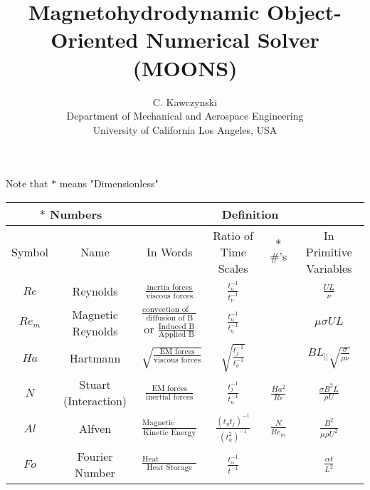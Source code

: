 \documentclass[landscape, 12pt]{report}
\begin{document}
\doublespacing
\title{Magnetohydrodynamic Object-Oriented Numerical Solver (MOONS)}
\author{C. Kawczynski \\
Department of Mechanical and Aerospace Engineering \\
University of California Los Angeles, USA\\}
\maketitle

Note that $*$ means "Dimensionless"

\resizebox{19cm}{!} {
	\begin{tabular}{|c|c|c|c|c|c|}
		\hline

		\multicolumn{2}{|c|}{$*$ Numbers} & \multicolumn{4}{|c|}{Definition} \\
		\hline
		Symbol & 
		Name &	
		In Words & 
		Ratio of Time Scales & 
		$*$ \#'s & 
		In Primitive Variables \\

		\hline \hline \hline
		\hline \hline \hline

		$Re$ 
		& Reynolds 
		& $\frac{\text{inertia forces}}{\text{viscous forces}}$
		& $\frac{t_u^{-1}}{t_{\nu}^{-1}}$
		&
		& $\frac{U L}{\nu}$ \\
		\hline

		$Re_m$ 
		& Magnetic Reynolds 
		& $\frac{\text{convection of B}}{\text{diffusion of B}}$
		or $\frac{\text{Induced B}}{\text{Applied B}}$
		& $\frac{t_u^{-1}}{t_{\eta}^{-1}}$
		&
		& $\mu \sigma U L$ \\
		\hline

		$Ha$ 
		& Hartmann
		& $\sqrt{\frac{\text{EM forces}}{\text{viscous forces}}}$
		& $\sqrt{\frac{t_{j}^{-1}}{t_{\nu}^{-1}}}$
		&
		& $B L_{||} \sqrt{\frac{\sigma}{\rho \nu}}$ \\
		\hline

		$N$ 
		& Stuart (Interaction)
		& $\frac{\text{EM forces}}{\text{inertial forces}}$
		& $\frac{t_j^{-1}}{t_{u}^{-1}}$
		& $\frac{Ha^2}{Re}$
		& $\frac{\sigma B^2 L}{\rho U}$ \\
		\hline

		$Al$ 
		& Alfven
		& $\frac{\text{Magnetic Energy}}{\text{Kinetic Energy}}$
		& $\frac{(t_{\eta} t_j)^{-1}}{(t_{u}^2)^{-1}}$
		& $\frac{N}{Re_m}$
		& $\frac{B^2}{\mu \rho U^2}$ \\
		\hline

		$Fo$ 
		& Fourier Number
		& $\frac{\text{Heat Conduction}}{\text{Heat Storage}}$
		& $\frac{t_{\alpha}^{-1}}{t^{-1}}$
		& 
		& $\frac{\alpha t}{L^2}$ \\
		\hline


\end{tabular}}
\end{document}
